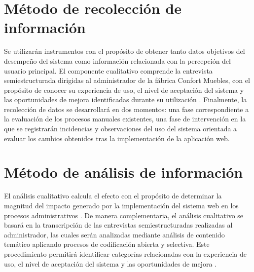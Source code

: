 \section{Método de recolección de información}

Se utilizarán instrumentos con el propósito de obtener tanto datos objetivos del desempeño del sistema como información relacionada con la percepción del usuario principal. El componente cualitativo comprende la entrevista semiestructurada dirigidas al administrador de la fábrica Confort Muebles, con el propósito de conocer su experiencia de uso, el nivel de aceptación del sistema y las oportunidades de mejora identificadas durante su utilización \parencite{flick2021}. Finalmente, la recolección de datos se desarrollará en dos momentos: una fase correspondiente a la evaluación de los procesos manuales existentes, una fase de intervención en la que se registrarán incidencias y observaciones del uso del sistema orientada a evaluar los cambios obtenidos tras la implementación de la aplicación web.
\section{Método de análisis de información}

El análisis cualitativo calcula el efecto con el propósito de determinar la magnitud del impacto generado por la implementación del sistema web en los procesos administrativos \parencite{creswell2019}. De manera complementaria, el análisis cualitativo se basará en la transcripción de las entrevistas semiestructuradas realizadas al administrador, las cuales serán analizadas mediante análisis de contenido temático aplicando procesos de codificación abierta y selectiva. Este procedimiento permitirá identificar categorías relacionadas con la experiencia de uso, el nivel de aceptación del sistema y las oportunidades de mejora \parencite{flick2021}.